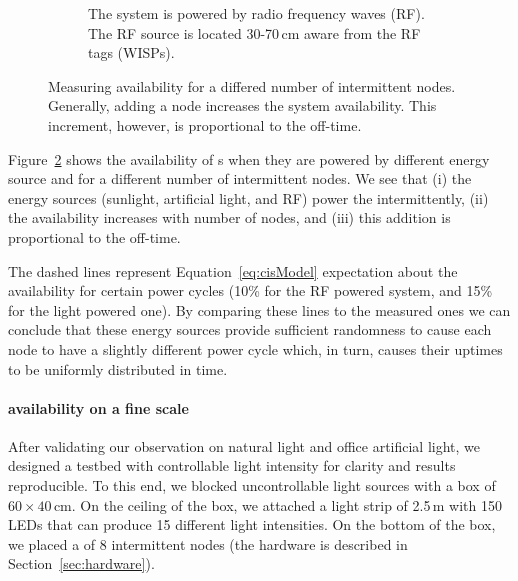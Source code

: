 \begin{figure}[t]
\begin{subfigure}{.66\columnwidth}
                \caption{The system is powered by radio frequency waves (RF). The RF source is located 30-70\,cm aware from the RF tags (WISPs).}
            \label{fig:rfPwrCIS}
        \end{subfigure}
        \caption{Measuring \fullsys availability for a differed number of intermittent nodes. Generally, adding a node increases the system availability. This increment, however, is proportional to the \sys off-time.}
        \label{fig:pwrCIS}
\end{figure} 

Figure~\ref{fig:pwrCIS} shows the availability of \sys{}s when they are powered by different energy source and for a different number of intermittent nodes. We see that (i) the energy sources (sunlight, artificial light, and RF) power the \sys intermittently, (ii) the \sys availability increases with number of nodes, and (iii) this addition is proportional to the \sys off-time. 

The dashed lines represent Equation~\ref{eq:cisModel} expectation about the \sys availability for certain power cycles (10\% for the RF powered system, and 15\% for the light powered one). By comparing these lines to the measured ones we can conclude that these energy sources provide sufficient randomness to cause each node to have a slightly different power cycle which, in turn, causes their uptimes to be uniformly distributed in time.  


\paragraph{availability on a fine scale}

After validating our observation on natural light and office artificial light, we designed a testbed with controllable light intensity for clarity and results reproducible. To this end, we blocked uncontrollable light sources with a box of $60 \times 40$\,cm. On the ceiling of the box, we attached a light strip of 2.5\,m with 150 LEDs that can produce 15 different light intensities. On the bottom of the box, we placed a \fullcim of 8 intermittent nodes (the hardware is described in Section~\ref{sec:hardware}).

